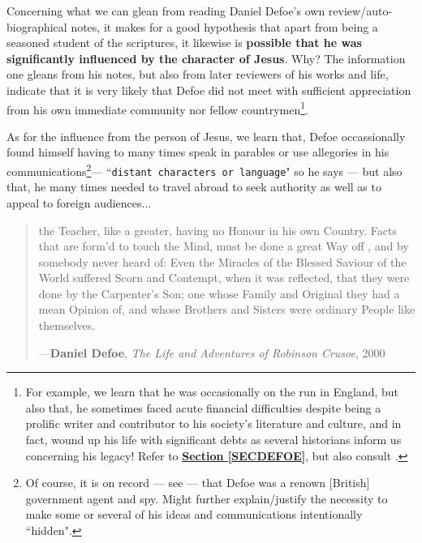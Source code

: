 \documentclass[a4paper]{article}
\begin{document}
Concerning what we can glean from reading Daniel Defoe's own review/auto-biographical notes, it makes for a good hypothesis that apart from being a seasoned student of the scriptures, it likewise is \textbf{possible that he was significantly influenced by the character of Jesus}. Why? The information one gleans from his notes, but also from later reviewers of his works and life, indicate that it is very likely that Defoe did not meet with sufficient appreciation from his own immediate community nor fellow countrymen\footnote{For example, we learn that he was occasionally on the run in England, but also that, he sometimes faced acute financial difficulties despite being a prolific writer and contributor to his society's literature and culture, and in fact, wound up his life with significant debts as several historians inform us concerning his legacy! Refer to \textbf{\hyperref[SECDEFOE]{Section \ref{SECDEFOE}}}, but also consult \cite{copilot_assistant}.}. 

As for the influence from the person of Jesus, we learn that, Defoe occassionally found himself having to many times speak in parables or use allegories in his communications\footnote{Of course, it is on record --- see \cite{copilot_assistant} --- that Defoe was a renown [British] government agent and spy. Might further explain/justify the necessity to make some or several of his ideas and communications intentionally ``hidden".}--- ``\texttt{distant characters or language}" so he says --- but also that, he many times needed to travel abroad to seek authority as well as to appeal to foreign audiences...



\noindent
\begin{minipage}{1\textwidth}
\vspace{1em}
\begin{quotation}
{\ttfamily


the Teacher, like a greater, having no Honour in his own Country. Facts that are form’d to touch the Mind, must be done a great Way off , and by somebody never heard of: Even the Miracles of the Blessed Saviour of the World suffered Scorn and Contempt, when it was reflected, that they were done by the Carpenter’s Son; one whose Family and Original they had a mean Opinion of, and whose Brothers and Sisters were ordinary People like themselves.


}
\hspace*{\fill} ---\textbf{Daniel Defoe}, \textit{The Life and Adventures of Robinson Crusoe}, 2000\cite{Defoe2007}
\end{quotation}
\vspace{1em}
\end{minipage}
\end{document}
